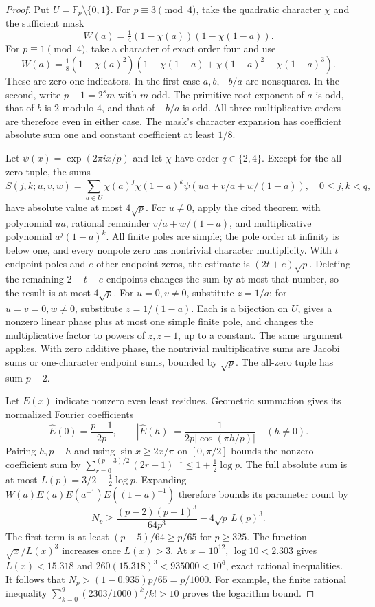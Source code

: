 \begin{proof}
Put $U=\mathbb F_p\setminus\{0,1\}$. For $p\equiv3\pmod4$,
take the quadratic character $\chi$ and the sufficient mask
\[
 W(a)=\tfrac14(1-\chi(a))(1-\chi(1-a)).
\]
For $p\equiv1\pmod4$, take a character of exact order four and use
\[
 W(a)=\tfrac18(1-\chi(a)^2)
       (1-\chi(1-a)+\chi(1-a)^2-\chi(1-a)^3).
\]
These are zero-one indicators. In the first case $a,b,-b/a$
are nonsquares. In the second, write $p-1=2^s m$ with $m$ odd.
The primitive-root exponent of $a$ is odd, that of $b$ is $2$
modulo $4$, and that of $-b/a$ is odd. All three multiplicative
orders are therefore even in either case. The mask's character
expansion has coefficient absolute sum one and constant coefficient
at least $1/8$.

Let $\psi(x)=\exp(2\pi i x/p)$ and let $\chi$ have order
$q\in\{2,4\}$. Except for the all-zero tuple, the sums
\[
 S(j,k;u,v,w)=
 \sum_{a\in U}\chi(a)^j\chi(1-a)^k
       \psi(ua+v/a+w/(1-a)),\quad 0\leq j,k<q,
\]
have absolute value at most $4\sqrt p$. For $u\ne0$, apply the
cited theorem with polynomial $ua$, rational remainder
$v/a+w/(1-a)$, and multiplicative polynomial $a^j(1-a)^k$.
All finite poles are simple; the pole order at infinity is below
one, and every nonpole zero has nontrivial character multiplicity.
With $t$ endpoint poles and $e$ other endpoint zeros, the estimate
is $(2t+e)\sqrt p$. Deleting the remaining $2-t-e$ endpoints
changes the sum by at most that number, so the result is at most
$4\sqrt p$. For $u=0,v\ne0$, substitute $z=1/a$; for
$u=v=0,w\ne0$, substitute $z=1/(1-a)$. Each is a bijection on
$U$, gives a nonzero linear phase plus at most one simple finite
pole, and changes the multiplicative factor to powers of $z,z-1$,
up to a constant. The same argument applies. With zero additive
phase, the nontrivial multiplicative sums are Jacobi sums or
one-character endpoint sums, bounded by $\sqrt p$.
The all-zero tuple has sum $p-2$.

Let $E(x)$ indicate nonzero even least residues. Geometric summation
gives its normalized Fourier coefficients
\[
 \widehat E(0)=\frac{p-1}{2p},\qquad
 |\widehat E(h)|=\frac{1}{2p|\cos(\pi h/p)|}\quad(h\ne0).
\]
Pairing $h,p-h$ and using $\sin x\geq2x/\pi$ on $[0,\pi/2]$
bounds the nonzero coefficient sum by
$\sum_{r=0}^{(p-3)/2}(2r+1)^{-1}\leq1+\tfrac12\log p$.
The full absolute sum is at most $L(p)=3/2+\tfrac12\log p$.
Expanding $W(a)E(a)E(a^{-1})E((1-a)^{-1})$ therefore bounds
its parameter count by
\begin{equation}
 N_p\geq\frac{(p-2)(p-1)^3}{64p^3}
                   -4\sqrt p\,L(p)^3.
 \label{eq:large-prime-count}
\end{equation}
The first term is at least $(p-5)/64\geq p/65$ for $p\geq325$.
The function $\sqrt x/L(x)^3$ increases once $L(x)>3$.
At $x=10^{12}$, $\log10<2.303$ gives $L(x)<15.318$ and
$260(15.318)^3<935000<10^6$, exact rational inequalities.
It follows that $N_p>(1-0.935)p/65=p/1000$.
For example, the finite rational inequality
$\sum_{k=0}^9(2303/1000)^k/k!>10$ proves the logarithm bound.
\end{proof}

